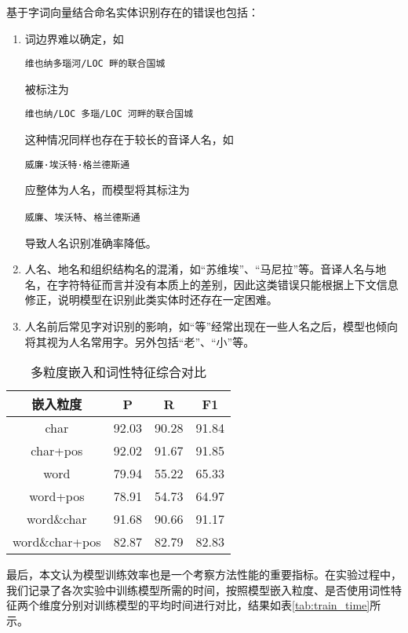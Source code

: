 基于字词向量结合命名实体识别存在的错误也包括：
\begin{enumerate}
    \item 词边界难以确定，如
        \begin{center}
            \verb|维也纳多瑙河/LOC 畔的联合国城|
        \end{center}
        被标注为
        \begin{center}
            \verb|维也纳/LOC 多瑙/LOC 河畔的联合国城|
        \end{center}
        这种情况同样也存在于较长的音译人名，如
        \begin{center}
            \verb|威廉·埃沃特·格兰德斯通|
        \end{center}
        应整体为人名，而模型将其标注为
        \begin{center}
            \verb|威廉|、\verb|埃沃特|、\verb|格兰德斯通|
        \end{center}
        导致人名识别准确率降低。
    \item 人名、地名和组织结构名的混淆，如“苏维埃”、“马尼拉”等。音译人名与地名，在字符特征而言并没有本质上的差别，因此这类错误只能根据上下文信息修正，说明模型在识别此类实体时还存在一定困难。
    \item 人名前后常见字对识别的影响，如“等”经常出现在一些人名之后，模型也倾向将其视为人名常用字。另外包括“老”、“小”等。
\end{enumerate}

\begin{table}[H]
    \centering
    \caption{多粒度嵌入和词性特征综合对比}
    \begin{tabular}{cccc}
        \toprule
        嵌入粒度 & P  & R  & F1\\
        \midrule
        char & 92.03 & 90.28 & 91.84\\
        char+pos & 92.02 &  91.67 & 91.85\\
        word & 79.94 & 55.22 & 65.33\\
        word+pos & 78.91 & 54.73 & 64.97\\
        word\&char & 91.68 & 90.66 & 91.17\\
        word\&char+pos & 82.87 & 82.79 & 82.83\\
        \bottomrule
    \end{tabular}
    \label{tab:overall_comparison}
\end{table}


最后，本文认为模型训练效率也是一个考察方法性能的重要指标。在实验过程中，我们记录了各次实验中训练模型所需的时间，按照模型嵌入粒度、是否使用词性特征两个维度分别对训练模型的平均时间进行对比，结果如表\ref{tab:train_time}所示。

